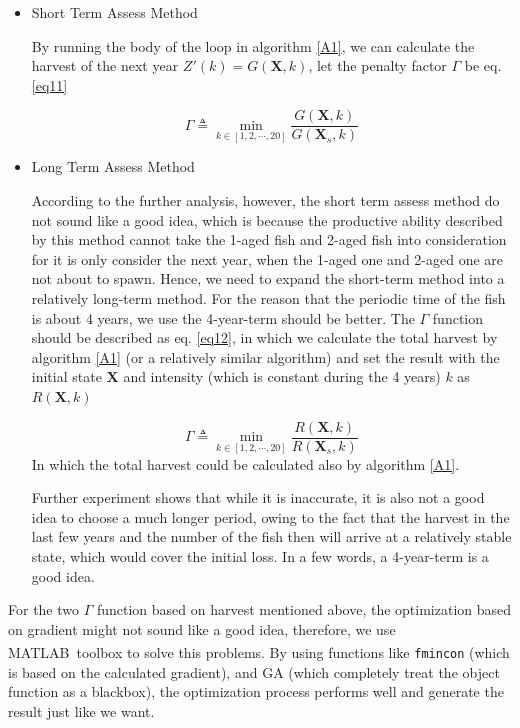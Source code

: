 \documentclass{IEEEtran}
\begin{document}
\begin{itemize}
    \item {Short Term Assess Method

    By running the body of the loop in algorithm \ref{A1}, we can calculate the harvest of the next year $Z'(k) = G(\bm X,k)$, let the penalty factor $\Gamma$ be eq. \ref{eq11}
    
    \begin{equation}
        \label{eq11}
        \Gamma \triangleq \min_{k \in[1,2,\cdots,20]} \frac{G(\bm X,k)}{G(\bm X_s,k)}
    \end{equation}
    }

    \item {Long Term Assess Method
        
    According to the further analysis, however, the short term assess method do not sound like a good idea, which is because the productive ability described by this method cannot take the 1-aged fish and 2-aged fish into consideration for it is only consider the next year, when the 1-aged one and 2-aged one are not about to spawn. Hence, we need to expand the short-term method into a relatively long-term method. For the reason that the periodic time of the fish is about 4 years, we use the 4-year-term should be better. The $\Gamma$ function should be described as eq. \ref{eq12}, in which we calculate the total harvest by algorithm \ref{A1} (or a relatively similar algorithm) and set the result with the initial state $\bm X$ and intensity (which is constant during the 4 years) $k$ as $R(\bm X,k)$
    
    \begin{equation}
        \label{eq12}
        \Gamma \triangleq \min_{k \in[1,2,\cdots,20]} \frac{R(\bm X,k)}{R(\bm X_s,k)}
    \end{equation}
    In which the total harvest could be calculated also by algorithm \ref{A1}.

    Further experiment shows that while it is inaccurate, it is also not a good idea to choose a much longer period, owing to the fact that the harvest in the last few years and the number of the fish then will arrive at a relatively stable state, which would cover the initial loss. In a few words, a 4-year-term is a good idea.
        }
\end{itemize}

For the two $\Gamma$ function based on harvest mentioned above, the optimization based on gradient might not sound like a good idea, therefore, we use MATLAB\textsuperscript\textregistered \ toolbox\textsuperscript{\cite{MATLABOptimizationToolbox}} to solve this problems. By using functions like \texttt{fmincon} (which is based on the calculated gradient), and GA (which completely treat the object function as a blackbox), the optimization process performs well and generate the result just like we want.
\end{document}
